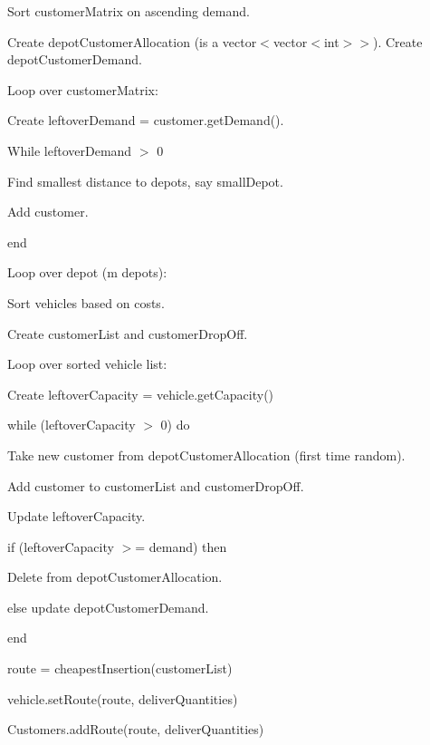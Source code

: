 \begin{DoxyEnumerate}
\item Sort {\ttfamily customer\+Matrix} on ascending demand.
\item Create {\ttfamily depot\+Customer\+Allocation} (is a {\ttfamily vector$<$vector$<$int$>$$>$}). Create {\ttfamily depot\+Customer\+Demand}.
\item Loop over {\ttfamily customer\+Matrix}\+:
\begin{DoxyItemize}
\item Create {\ttfamily leftover\+Demand = customer.\+get\+Demand()}.
\item While {\ttfamily leftover\+Demand $>$ 0}
\begin{DoxyItemize}
\item Find smallest distance to depots, say {\ttfamily small\+Depot}.
\item Add customer.
\end{DoxyItemize}
\item end
\end{DoxyItemize}
\item Loop over depot (m depots)\+:
\begin{DoxyItemize}
\item Sort vehicles based on costs.
\item Create {\ttfamily customer\+List} and {\ttfamily customer\+Drop\+Off}.
\item Loop over sorted vehicle list\+:
\begin{DoxyItemize}
\item Create {\ttfamily leftover\+Capacity = vehicle.\+get\+Capacity()}
\item while ({\ttfamily leftover\+Capacity $>$ 0}) do
\begin{DoxyItemize}
\item Take new customer from {\ttfamily depot\+Customer\+Allocation} (first time random).
\item Add customer to {\ttfamily customer\+List} and {\ttfamily customer\+Drop\+Off}.
\item Update {\ttfamily leftover\+Capacity}.
\item if ({\ttfamily leftover\+Capacity $>$= demand}) then
\begin{DoxyItemize}
\item Delete from {\ttfamily depot\+Customer\+Allocation}.
\end{DoxyItemize}
\item else update {\ttfamily depot\+Customer\+Demand}.
\end{DoxyItemize}
\item end
\item {\ttfamily route = cheapest\+Insertion(customer\+List)}
\item {\ttfamily vehicle.\+set\+Route(route, deliver\+Quantities)}
\item {\ttfamily Customers.\+add\+Route(route, deliver\+Quantities)}
\end{DoxyItemize}
\end{DoxyItemize}
\end{DoxyEnumerate}

